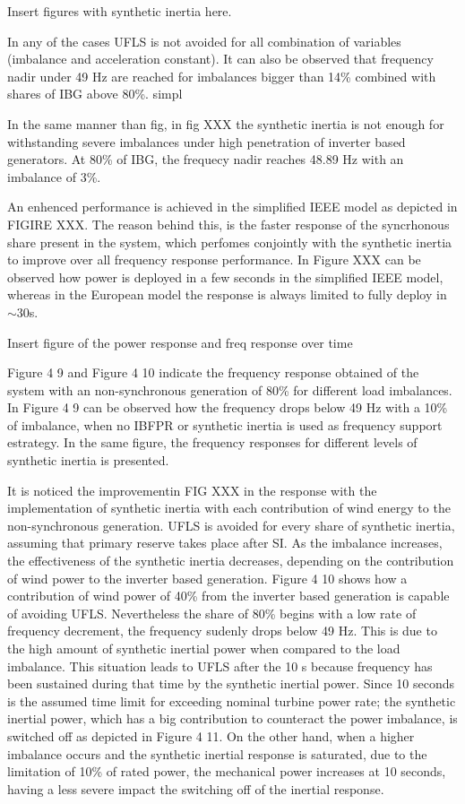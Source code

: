 Insert figures with synthetic inertia here.

In any of the cases UFLS is not avoided for all combination of variables (imbalance and acceleration constant). It can also be observed that frequency nadir under 49 Hz are reached for imbalances bigger than 14\% combined with shares of IBG above 80\%. simpl

In the same manner than fig, in fig XXX the synthetic inertia is not enough for withstanding severe imbalances under high penetration of inverter based generators. At 80\% of IBG, the frequecy nadir reaches 48.89 Hz with an imbalance of 3\%. 

An enhenced performance is achieved in the simplified IEEE model as depicted in FIGIRE XXX. The reason behind this, is the faster response of the syncrhonous share present in the system, which perfomes conjointly with the synthetic inertia to improve over all frequency response performance. In Figure XXX can be observed how power is deployed in a few seconds in the simplified IEEE model, whereas in the European model the response is always limited to fully deploy in $ \sim 30 $s.

Insert figure of the power response and freq response over time

Figure 4 9 and Figure 4 10 indicate the frequency response obtained of the system with an non-synchronous generation of 80\% for different load imbalances.  
In Figure 4 9 can be observed how the frequency drops below 49 Hz with a 10\% of imbalance, when no IBFPR or synthetic inertia is used as frequency support estrategy. In the same figure, the frequency responses for different levels of synthetic inertia is presented. 

It is noticed the improvementin FIG XXX in the response with the implementation of synthetic inertia with each contribution of wind energy to the non-synchronous generation. UFLS is avoided for every share of synthetic inertia, assuming that primary reserve takes place after SI.
As the imbalance increases, the effectiveness of the synthetic inertia decreases, depending on the contribution of wind power to the inverter based generation. Figure 4 10 shows how a contribution of wind power of 40\% from the inverter based generation is capable of avoiding UFLS. Nevertheless the share of 80\% begins with a low rate of frequency decrement, the frequency sudenly drops below 49 Hz. This is due to the high amount of synthetic inertial power when compared to the load imbalance. This situation leads to UFLS after the 10 s because frequency has been sustained during that time by the synthetic inertial power. Since 10 seconds is the assumed time limit for exceeding nominal turbine power rate; the synthetic inertial power, which has a big contribution to counteract the power imbalance, is switched off as depicted in Figure 4 11. On the other hand, when a higher imbalance occurs and the synthetic inertial response is saturated, due to the limitation of 10\% of rated power, the mechanical power increases at 10 seconds, having a less severe impact the switching off of the inertial response.




